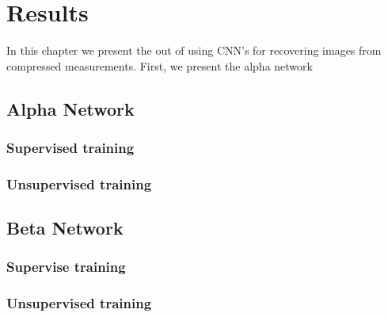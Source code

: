 \chapter{Results}
In this chapter we present the out of using CNN's for recovering images from compressed measurements. First, we present the alpha network 

\section{Alpha Network}

\subsection{Supervised training}

\subsection{Unsupervised training}

\section{Beta Network}

\subsection{Supervise training}

\subsection{Unsupervised training}
